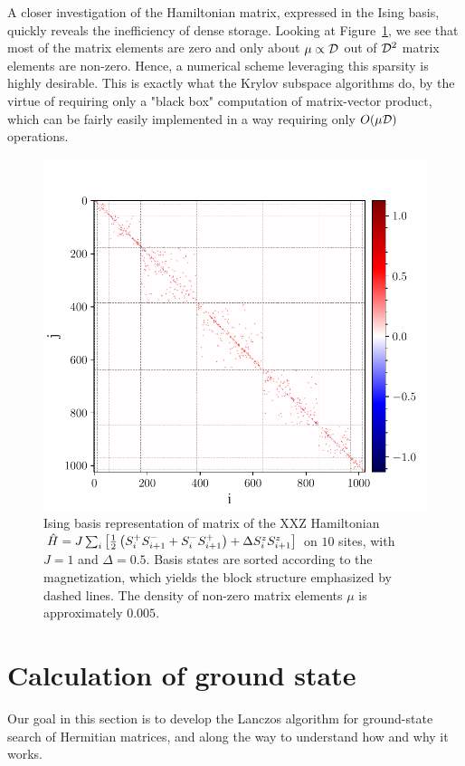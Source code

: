 A closer investigation of the Hamiltonian matrix, expressed in the Ising basis,
quickly reveals the inefficiency of dense storage. Looking at Figure~\ref{fig:sparse_structure}, we see that most of
the matrix elements are zero and only about \(\mu \propto \mathcal{D} \) out of \(\mathcal{D}^2\) matrix elements
are non-zero. Hence, a numerical scheme leveraging this sparsity is highly desirable. This is exactly what the Krylov subspace algorithms
do, by the virtue of requiring only a "black box" computation of matrix-vector product, which can be fairly easily implemented in a way
requiring only \(O(\mu \mathcal{D})\) operations.

\begin{figure}[htbp]
	\centering
	\includegraphics[width=0.7\linewidth, trim={0 0 0 1.2cm}, clip ]{Figures/matrix_elements.pdf}
	\caption{Ising basis representation of matrix of the XXZ Hamiltonian \(\hat{H}  = J\sum_{i} \left[\frac{1}{2}\left(S^{+}_i S^{-}_{i+1} +
			S^{-}_{i}S^{+}_{i+1}\right) + \Delta S^{z}_i S^{z}_{i+1}\right]\) on \(10\) sites, with \(J = 1\) and \(\Delta=0.5\).
		Basis states are sorted according to the magnetization, which yields the block structure emphasized by dashed lines.
		The density of non-zero matrix elements \(\mu\) is approximately \(0.005\).}
	\label{fig:sparse_structure}
\end{figure}

\vspace*{-0.5cm}
\section{Calculation of ground state}
Our goal in this section is to develop the Lanczos algorithm for ground-state search of Hermitian matrices, and along
the way to understand how and why it works.

